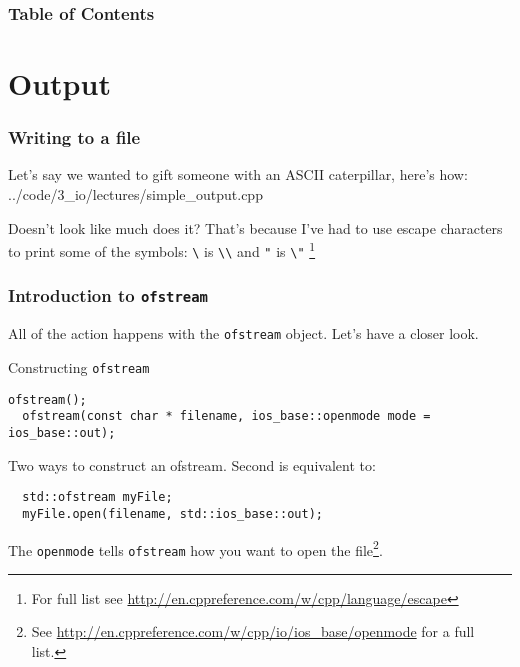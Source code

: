 \documentclass{beamer}
\subtitle{Session 4: Input, output and text manipulation}
\begin{document}
\frame{\titlepage}

\begin{frame}
\frametitle{Table of Contents}
\tableofcontents
\end{frame}

\section{Output}

\begin{frame}[fragile]
  \frametitle{Writing to a file}
  
  Let's say we wanted to gift someone with an ASCII caterpillar, here's how:
  \pause
  	{../code/3_io/lectures/simple_output.cpp}

  Doesn't look like much does it?  That's because I've had to use escape characters to print some of the symbols:
  	\texttt{\textbackslash} is \texttt{\textbackslash\textbackslash} and
  	\texttt{"}  is \texttt{\textbackslash"} \footnote{For full list see \url{http://en.cppreference.com/w/cpp/language/escape}}

\end{frame}

\begin{frame}[fragile]
  \frametitle{Introduction to  \texttt{ofstream}}
  
  All of the action happens with the \texttt{ofstream} object.  Let's have a closer look.
  \pause
  \begin{block}{Constructing \texttt{ofstream}}
    \begin{lstlisting}[aboveskip=0pt]
  ofstream();
  ofstream(const char * filename, ios_base::openmode mode = ios_base::out);
    \end{lstlisting}
  Two ways to construct an ofstream.  Second is equivalent to:
    \begin{lstlisting}
  std::ofstream myFile;
  myFile.open(filename, std::ios_base::out);
    \end{lstlisting}
    The \texttt{openmode} tells \texttt{ofstream} how you want to open the file\footnote{See \url{http://en.cppreference.com/w/cpp/io/ios_base/openmode} for a full list.}.
  \end{block}

\end{frame}
\end{document}
